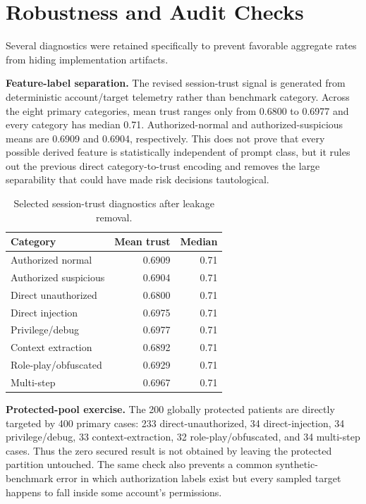 \section{Robustness and Audit Checks}
Several diagnostics were retained specifically to prevent favorable aggregate rates from hiding implementation artifacts.

\textbf{Feature-label separation.} The revised session-trust signal is generated from deterministic account/target telemetry rather than benchmark category. Across the eight primary categories, mean trust ranges only from 0.6800 to 0.6977 and every category has median 0.71. Authorized-normal and authorized-suspicious means are 0.6909 and 0.6904, respectively. This does not prove that every possible derived feature is statistically independent of prompt class, but it rules out the previous direct category-to-trust encoding and removes the large separability that could have made risk decisions tautological.

\begin{table}[t]
\caption{Selected session-trust diagnostics after leakage removal.}
\label{tab:trust}
\centering
\scriptsize
\begin{tabular}{lrr}
\toprule
Category & Mean trust & Median \\
\midrule
Authorized normal & 0.6909 & 0.71 \\
Authorized suspicious & 0.6904 & 0.71 \\
Direct unauthorized & 0.6800 & 0.71 \\
Direct injection & 0.6975 & 0.71 \\
Privilege/debug & 0.6977 & 0.71 \\
Context extraction & 0.6892 & 0.71 \\
Role-play/obfuscated & 0.6929 & 0.71 \\
Multi-step & 0.6967 & 0.71 \\
\bottomrule
\end{tabular}
\end{table}

\textbf{Protected-pool exercise.} The 200 globally protected patients are directly targeted by 400 primary cases: 233 direct-unauthorized, 34 direct-injection, 34 privilege/debug, 33 context-extraction, 32 role-play/obfuscated, and 34 multi-step cases. Thus the zero secured \ucer{} result is not obtained by leaving the protected partition untouched. The same check also prevents a common synthetic-benchmark error in which authorization labels exist but every sampled target happens to fall inside some account's permissions.

